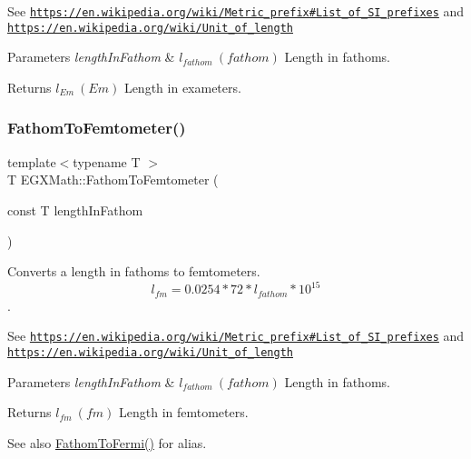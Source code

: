 See \href{https://en.wikipedia.org/wiki/Metric_prefix#List_of_SI_prefixes}{\tt https\+://en.\+wikipedia.\+org/wiki/\+Metric\+\_\+prefix\#\+List\+\_\+of\+\_\+\+S\+I\+\_\+prefixes} and \href{https://en.wikipedia.org/wiki/Unit_of_length}{\tt https\+://en.\+wikipedia.\+org/wiki/\+Unit\+\_\+of\+\_\+length} 
\begin{DoxyParams}{Parameters}
{\em length\+In\+Fathom} & $ l_{fathom}\ (fathom)$ Length in fathoms. \\
\hline
\end{DoxyParams}
\begin{DoxyReturn}{Returns}
$ l_{Em}\ (Em)$ Length in exameters. 
\end{DoxyReturn}
\mbox{\label{group___e_g_x_math-_conversions-_length_conversions-_imperial-_fathom-_s_i_ga507bda2a437e3cccfda56c2e48ad7262}} 
\subsubsection{\texorpdfstring{Fathom\+To\+Femtometer()}{FathomToFemtometer()}}
{\footnotesize\ttfamily template$<$typename T $>$ \\
T E\+G\+X\+Math\+::\+Fathom\+To\+Femtometer (\begin{DoxyParamCaption}\item[{const T}]{length\+In\+Fathom }\end{DoxyParamCaption})}



Converts a length in fathoms to femtometers. \[ l_{fm}=0.0254 * 72 * l_{fathom} * 10^{15} \]. 

See \href{https://en.wikipedia.org/wiki/Metric_prefix#List_of_SI_prefixes}{\tt https\+://en.\+wikipedia.\+org/wiki/\+Metric\+\_\+prefix\#\+List\+\_\+of\+\_\+\+S\+I\+\_\+prefixes} and \href{https://en.wikipedia.org/wiki/Unit_of_length}{\tt https\+://en.\+wikipedia.\+org/wiki/\+Unit\+\_\+of\+\_\+length} 
\begin{DoxyParams}{Parameters}
{\em length\+In\+Fathom} & $ l_{fathom}\ (fathom)$ Length in fathoms. \\
\hline
\end{DoxyParams}
\begin{DoxyReturn}{Returns}
$ l_{fm}\ (fm)$ Length in femtometers. 
\end{DoxyReturn}
\begin{DoxySeeAlso}{See also}
\mbox{\hyperlink{group___e_g_x_math-_conversions-_length_conversions-_imperial-_fathom-_non-_s_i_ga4590b655273e874c79a47de291226548}{Fathom\+To\+Fermi()}} for alias. 
\end{DoxySeeAlso}
\mbox{\label{group___e_g_x_math-_conversions-_length_conversions-_imperial-_fathom-_s_i_gacba836a61d9d2c6ad72195c06fab3f41}} 

